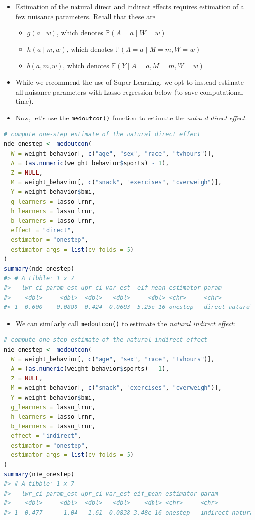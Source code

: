 \documentclass[
  12pt,
]{book}
\newcommand{\passthrough}[1]{#1}
\providecommand{\tightlist}{%
  \setlength{\itemsep}{0pt}\setlength{\parskip}{0pt}}
\theoremstyle{definition}
\theoremstyle{definition}
\theoremstyle{definition}
\renewcommand{\P}{\mathbb{P}}
\newcommand{\E}{\mathbb{E}}
\newcommand{\1}{\mathbbm{1}}
\begin{document}
\begin{itemize}
\tightlist
\item
  Estimation of the natural direct and indirect effects requires estimation of a
  few nuisance parameters. Recall that these are

  \begin{itemize}
  \tightlist
  \item
    \(g(a\mid w)\), which denotes \(\P(A=a \mid W=w)\)
  \item
    \(h(a\mid m, w)\), which denotes \(\P(A=a \mid M=m, W=w)\)
  \item
    \(b(a, m, w)\), which denotes \(\E(Y \mid A=a, M=m, W=w)\)
  \end{itemize}
\item
  While we recommend the use of Super Learning, we opt to instead estimate all
  nuisance parameters with Lasso regression below (to save computational time).
\item
  Now, let's use the \passthrough{\lstinline!medoutcon()!} function to estimate the \emph{natural direct
  effect}:
\end{itemize}

\begin{lstlisting}[language=R]
# compute one-step estimate of the natural direct effect
nde_onestep <- medoutcon(
  W = weight_behavior[, c("age", "sex", "race", "tvhours")],
  A = (as.numeric(weight_behavior$sports) - 1),
  Z = NULL,
  M = weight_behavior[, c("snack", "exercises", "overweigh")],
  Y = weight_behavior$bmi,
  g_learners = lasso_lrnr,
  h_learners = lasso_lrnr,
  b_learners = lasso_lrnr,
  effect = "direct",
  estimator = "onestep",
  estimator_args = list(cv_folds = 5)
)
summary(nde_onestep)
#> # A tibble: 1 x 7
#>   lwr_ci param_est upr_ci var_est  eif_mean estimator param         
#>    <dbl>     <dbl>  <dbl>   <dbl>     <dbl> <chr>     <chr>         
#> 1 -0.600   -0.0880  0.424  0.0683 -5.25e-16 onestep   direct_natural
\end{lstlisting}

\begin{itemize}
\tightlist
\item
  We can similarly call \passthrough{\lstinline!medoutcon()!} to estimate the \emph{natural indirect effect}:
\end{itemize}

\begin{lstlisting}[language=R]
# compute one-step estimate of the natural indirect effect
nie_onestep <- medoutcon(
  W = weight_behavior[, c("age", "sex", "race", "tvhours")],
  A = (as.numeric(weight_behavior$sports) - 1),
  Z = NULL,
  M = weight_behavior[, c("snack", "exercises", "overweigh")],
  Y = weight_behavior$bmi,
  g_learners = lasso_lrnr,
  h_learners = lasso_lrnr,
  b_learners = lasso_lrnr,
  effect = "indirect",
  estimator = "onestep",
  estimator_args = list(cv_folds = 5)
)
summary(nie_onestep)
#> # A tibble: 1 x 7
#>   lwr_ci param_est upr_ci var_est eif_mean estimator param           
#>    <dbl>     <dbl>  <dbl>   <dbl>    <dbl> <chr>     <chr>           
#> 1  0.477      1.04   1.61  0.0838 3.48e-16 onestep   indirect_natural
\end{lstlisting}
\end{document}
